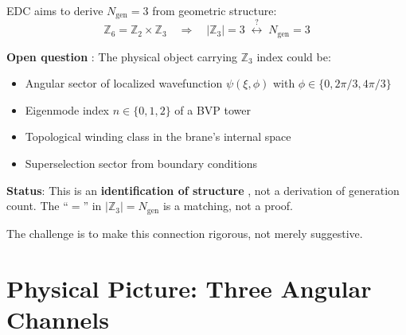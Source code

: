 EDC aims to derive $N_{\text{gen}} = 3$ from geometric structure:
\begin{equation}
    \mathbb{Z}_6 = \mathbb{Z}_2 \times \mathbb{Z}_3
    \quad\Longrightarrow\quad
    |\mathbb{Z}_3| = 3 \;\stackrel{?}{\longleftrightarrow}\; N_{\text{gen}} = 3
    \label{eq:z6_factor}
\end{equation}

\begin{tcolorbox}[colback=yellow!5, colframe=yellow!50!black, title=\textbf{Dictionary: What carries $\mathbb{Z}_3$ charge?}]
\textbf{Open question} \tagOpen{}: The physical object carrying $\mathbb{Z}_3$ index
could be:
\begin{itemize}[nosep]
\item Angular sector of localized wavefunction $\psi(\xi, \phi)$ with $\phi \in \{0, 2\pi/3, 4\pi/3\}$
\item Eigenmode index $n \in \{0,1,2\}$ of a BVP tower
\item Topological winding class in the brane's internal space
\item Superselection sector from boundary conditions
\end{itemize}
\textbf{Status}: This is an \textbf{identification of structure} \tagI{}, not a derivation
of generation count. The ``$=$'' in $|\mathbb{Z}_3| = N_{\text{gen}}$ is a matching,
not a proof.
\end{tcolorbox}

The challenge is to make this connection rigorous, not merely suggestive.

\section{Physical Picture: Three Angular Channels}
\label{sec:physical_picture}

